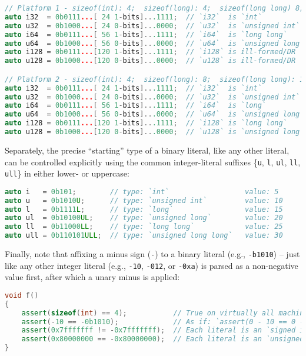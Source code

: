 \documentclass[twoside,10pt,letterpaper,usenames]{newstyle-PearsonGeneric-7-38}
\begin{document}
\begin{lstlisting}[language=C++, caption={missing caption}, label={testlabel}, frame=tb]
// Platform 1 - sizeof(int): 4;  sizeof(long): 4;  sizeof(long long) 8;
auto i32  = 0b0111...[ 24 1-bits]...1111;  // `i32`  is `int`
auto u32  = 0b1000...[ 24 0-bits]...0000;  // `u32`  is `unsigned int`
auto i64  = 0b0111...[ 56 1-bits]...1111;  // `i64`  is `long long`
auto u64  = 0b1000...[ 56 0-bits]...0000;  // `u64`  is `unsigned long long`
auto i128 = 0b0111...[120 1-bits]...1111;  // `i128` is ill-formed/DR
auto u128 = 0b1000...[120 0-bits]...0000;  // `u128` is ill-formed/DR

// Platform 2 - sizeof(int): 4;  sizeof(long): 8;  sizeof(long long): 16;
auto i32  = 0b0111...[ 24 1-bits]...1111;  // `i32`  is `int`
auto u32  = 0b1000...[ 24 0-bits]...0000;  // `u32`  is `unsigned int`
auto i64  = 0b0111...[ 56 1-bits]...1111;  // `i64`  is `long`
auto u64  = 0b1000...[ 56 0-bits]...0000;  // `u64`  is `unsigned long
auto i128 = 0b0111...[120 1-bits]...1111;  // `i128` is `long long`
auto u128 = 0b1000...[120 0-bits]...0000;  // `u128` is `unsigned long long`
\end{lstlisting}
    

Separately, the precise ``starting'' type of a binary literal, like any
other literal, can be controlled explicitly using the common
integer-literal suffixes \{\texttt{u}, \texttt{l}, \texttt{ul},
\texttt{ll}, \texttt{ull}\} in either lower- or uppercase:

\begin{lstlisting}[language=C++, caption={missing caption}, label={testlabel}, frame=tb]
auto i   = 0b101;        // type: `int`                  value: 5
auto u   = 0b1010U;      // type: `unsigned int`         value: 10
auto l   = 0b1111L;      // type: `long`                 value: 15
auto ul  = 0b10100UL;    // type: `unsigned long`        value: 20
auto ll  = 0b11000LL;    // type: `long long`            value: 25
auto ull = 0b110101ULL;  // type: `unsigned long long`   value: 30
\end{lstlisting}
    

Finally, note that affixing a minus sign (\texttt{-}) to a binary
literal (e.g., \texttt{-b1010}) -- just like any other integer literal
(e.g., \texttt{-10}, \texttt{-012}, or \texttt{-0xa}) is parsed as a
non-negative value first, after which a unary minus is applied:

\begin{lstlisting}[language=C++, caption={missing caption}, label={testlabel}, frame=tb]
void f()
{
    assert(sizeof(int) == 4);           // True on virtually all machines today.
    assert(-10 == -0b1010);             // As if: `assert(0 - 10 == 0 - 0b1010);`
    assert(0x7fffffff != -0x7fffffff);  // Each literal is an `signed int`.
    assert(0x80000000 == -0x80000000);  // Each literal is an `unsigned int`.
}
\end{lstlisting}
    
\end{document}
